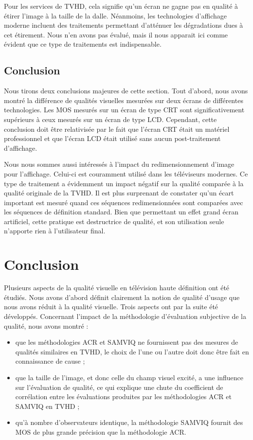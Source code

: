Pour les services de TVHD, cela signifie qu'un écran ne gagne pas en qualité à étirer l'image à la taille de la dalle. Néanmoins, les technologies d'affichage moderne incluent des traitements permettant d'atténuer les dégradations dues à cet étirement. Nous n'en avons pas évalué, mais il nous apparait ici comme évident que ce type de traitements est indispensable.


\subsection{Conclusion} %
Nous tirons deux conclusions majeures de cette section. Tout d'abord, nous avons montré la différence de qualités visuelles mesurées sur deux écrans de différentes technologies. Les MOS mesurés sur un écran de type CRT sont significativement supérieurs à ceux mesurés sur un écran de type LCD. Cependant, cette conclusion doit être relativisée par le fait que l'écran CRT était un matériel professionnel et que l'écran LCD était utilisé sans aucun post-traitement d'affichage. %

Nous nous sommes aussi intéressés à l'impact du redimensionnement d'image pour l'affichage. Celui-ci est couramment utilisé dans les téléviseurs modernes. Ce type de traitement a évidemment un impact négatif sur la qualité comparée à la qualité originale de la TVHD. Il est plus surprenant de constater qu'un écart important est mesuré quand ces séquences redimensionnées sont comparées avec les séquences de définition standard. Bien que permettant un effet grand écran artificiel, cette pratique est destructrice de qualité, et son utilisation seule n'apporte rien à l'utilisateur final.


\section{Conclusion}
Plusieurs aspects de la qualité visuelle en télévision haute définition ont été étudiés. Nous avons d'abord définit clairement la notion de qualité d'usage que nous avons réduit à la qualité visuelle. Trois aspects ont par la suite été développés. Concernant l'impact de la méthodologie d’évaluation subjective de la qualité, nous avons montré :
\begin{itemize}
\item que les méthodologies ACR et SAMVIQ ne fournissent pas des mesures de qualités similaires en TVHD, le choix de l'une ou l'autre doit donc être fait en connaissance de cause ;
\item que la taille de l'image, et donc celle du champ visuel excité, a une influence sur l'évaluation de qualité, ce qui explique une chute du coefficient de corrélation entre les évaluations produites par les méthodologies ACR et SAMVIQ en TVHD ;
\item qu'à nombre d'observateurs identique, la méthodologie SAMVIQ fournit des MOS de plus grande précision que la méthodologie ACR.
\end{itemize}

